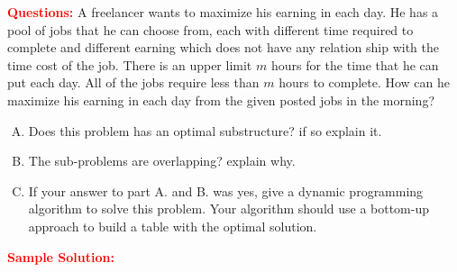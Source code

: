 \problem

\textcolor{Red}{\textbf{Questions:}}
A freelancer wants to maximize his earning in each day. He has a pool of jobs that he can choose from, each with different time required to complete and different earning which does not have any relation ship with the time cost of the job. There is an upper limit $m$ hours for the time that he can put each day. All of the jobs require less than $m$ hours to complete. How can he maximize his earning in each day from the given posted jobs in the morning?

\begin{enumerate}[A.]
	\item Does this problem has an optimal substructure? if so explain it.
	\item The sub-problems are overlapping? explain why.
	\item If your answer to part A. and B. was yes, give a dynamic programming algorithm to solve this problem. Your algorithm should use a bottom-up approach to build a table with the optimal solution.
\end{enumerate}


\textcolor{Red}{\textbf{Sample Solution:}}

